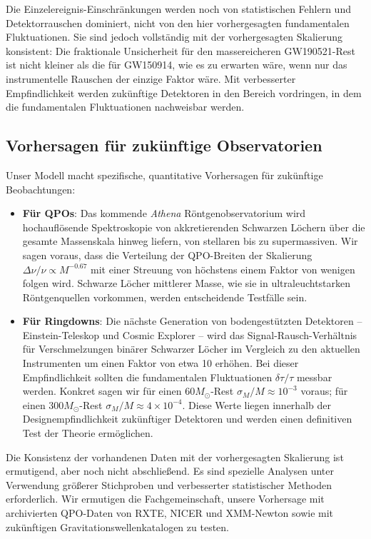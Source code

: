 \documentclass[12pt,a4paper]{article}
\begin{document}
	Die Einzelereignis-Einschränkungen werden noch von statistischen Fehlern und Detektorrauschen dominiert, nicht von den hier vorhergesagten fundamentalen Fluktuationen. Sie sind jedoch vollständig mit der vorhergesagten Skalierung konsistent: Die fraktionale Unsicherheit für den massereicheren GW190521-Rest ist nicht kleiner als die für GW150914, wie es zu erwarten wäre, wenn nur das instrumentelle Rauschen der einzige Faktor wäre. Mit verbesserter Empfindlichkeit werden zukünftige Detektoren in den Bereich vordringen, in dem die fundamentalen Fluktuationen nachweisbar werden.
	
	\subsection{Vorhersagen für zukünftige Observatorien}
	
	Unser Modell macht spezifische, quantitative Vorhersagen für zukünftige Beobachtungen:
	
	\begin{itemize}
		\item \textbf{Für QPOs}: Das kommende \textit{Athena} Röntgenobservatorium wird hochauflösende Spektroskopie von akkretierenden Schwarzen Löchern über die gesamte Massenskala hinweg liefern, von stellaren bis zu supermassiven. Wir sagen voraus, dass die Verteilung der QPO-Breiten der Skalierung \(\Delta\nu/\nu \propto M^{-0.67}\) mit einer Streuung von höchstens einem Faktor von wenigen folgen wird. Schwarze Löcher mittlerer Masse, wie sie in ultraleuchtstarken Röntgenquellen vorkommen, werden entscheidende Testfälle sein.
		
		\item \textbf{Für Ringdowns}: Die nächste Generation von bodengestützten Detektoren – Einstein-Teleskop und Cosmic Explorer – wird das Signal-Rausch-Verhältnis für Verschmelzungen binärer Schwarzer Löcher im Vergleich zu den aktuellen Instrumenten um einen Faktor von etwa 10 erhöhen. Bei dieser Empfindlichkeit sollten die fundamentalen Fluktuationen \(\delta\tau/\tau\) messbar werden. Konkret sagen wir für einen \(60 M_\odot\)-Rest \(\sigma_M/M \approx 10^{-3}\) voraus; für einen \(300 M_\odot\)-Rest \(\sigma_M/M \approx 4 \times 10^{-4}\). Diese Werte liegen innerhalb der Designempfindlichkeit zukünftiger Detektoren und werden einen definitiven Test der Theorie ermöglichen.
	\end{itemize}
	
	Die Konsistenz der vorhandenen Daten mit der vorhergesagten Skalierung ist ermutigend, aber noch nicht abschließend. Es sind spezielle Analysen unter Verwendung größerer Stichproben und verbesserter statistischer Methoden erforderlich. Wir ermutigen die Fachgemeinschaft, unsere Vorhersage mit archivierten QPO-Daten von RXTE, NICER und XMM-Newton sowie mit zukünftigen Gravitationswellenkatalogen zu testen.
	
\end{document}
